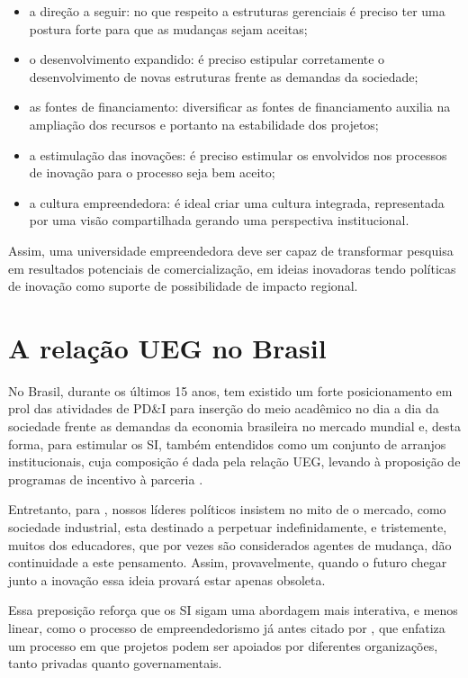 \begin{itemize}
  \item{a direção a seguir: no que respeito a estruturas gerenciais é preciso ter uma postura forte para que as mudanças sejam aceitas;}
  \item{o desenvolvimento expandido: é preciso estipular corretamente o desenvolvimento de novas estruturas frente as demandas da sociedade;}
  \item{as fontes de financiamento: diversificar as fontes de financiamento auxilia na ampliação dos recursos e portanto na estabilidade dos projetos;}
  \item{a estimulação das inovações: é preciso estimular os envolvidos nos processos de inovação para o processo seja bem aceito;}
  \item{a cultura empreendedora: é ideal criar uma cultura integrada, representada por uma visão compartilhada gerando uma perspectiva institucional.}
\end{itemize}

Assim, uma universidade empreendedora deve ser capaz de transformar pesquisa em resultados potenciais de comercialização, em ideias inovadoras tendo políticas de inovação como suporte de possibilidade de impacto regional.


\section{A relação UEG no Brasil}

No Brasil, durante os últimos 15 anos, tem existido um forte posicionamento em prol das atividades de PD\&I para inserção do meio acadêmico no dia a dia da sociedade frente as demandas da economia brasileira no mercado mundial e, desta forma, para estimular os SI, também entendidos como um conjunto de arranjos institucionais, cuja composição é dada pela relação UEG, levando à proposição de programas de incentivo à parceria \cite{vedovello2006capacidade, sbragia2006inovaccao}.

Entretanto, para , nossos líderes políticos insistem no mito de o mercado, como sociedade industrial, esta destinado a perpetuar indefinidamente, e tristemente, muitos dos educadores, que por vezes são considerados agentes de mudança, dão continuidade a este pensamento. Assim, provavelmente, quando o futuro chegar junto a inovação essa ideia provará estar apenas obsoleta.

Essa preposição reforça que os SI sigam uma abordagem mais interativa, e menos linear, como o processo de empreendedorismo já antes citado por , que enfatiza um processo em que projetos podem ser apoiados por diferentes organizações, tanto privadas quanto governamentais.

